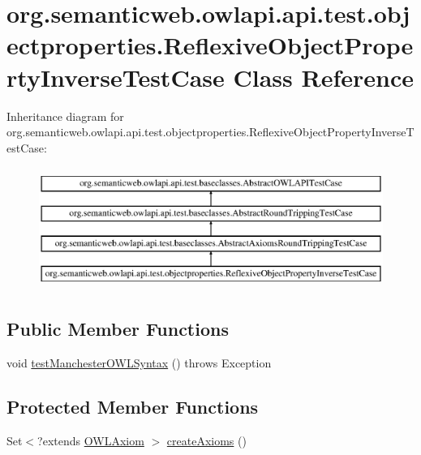 \hypertarget{classorg_1_1semanticweb_1_1owlapi_1_1api_1_1test_1_1objectproperties_1_1_reflexive_object_property_inverse_test_case}{\section{org.\-semanticweb.\-owlapi.\-api.\-test.\-objectproperties.\-Reflexive\-Object\-Property\-Inverse\-Test\-Case Class Reference}
\label{classorg_1_1semanticweb_1_1owlapi_1_1api_1_1test_1_1objectproperties_1_1_reflexive_object_property_inverse_test_case}
}
Inheritance diagram for org.\-semanticweb.\-owlapi.\-api.\-test.\-objectproperties.\-Reflexive\-Object\-Property\-Inverse\-Test\-Case\-:\begin{figure}[H]
\begin{center}
\leavevmode
\includegraphics[height=4.000000cm]{classorg_1_1semanticweb_1_1owlapi_1_1api_1_1test_1_1objectproperties_1_1_reflexive_object_property_inverse_test_case}
\end{center}
\end{figure}
\subsection*{Public Member Functions}
\begin{DoxyCompactItemize}
\item 
void \hyperlink{classorg_1_1semanticweb_1_1owlapi_1_1api_1_1test_1_1objectproperties_1_1_reflexive_object_property_inverse_test_case_a1ece801a60653a408b67cd009e87c474}{test\-Manchester\-O\-W\-L\-Syntax} ()  throws Exception 
\end{DoxyCompactItemize}
\subsection*{Protected Member Functions}
\begin{DoxyCompactItemize}
\item 
Set$<$?extends \hyperlink{interfaceorg_1_1semanticweb_1_1owlapi_1_1model_1_1_o_w_l_axiom}{O\-W\-L\-Axiom} $>$ \hyperlink{classorg_1_1semanticweb_1_1owlapi_1_1api_1_1test_1_1objectproperties_1_1_reflexive_object_property_inverse_test_case_a2135dfccf33d7f80ef8ba783e5f0a907}{create\-Axioms} ()
\end{DoxyCompactItemize}


